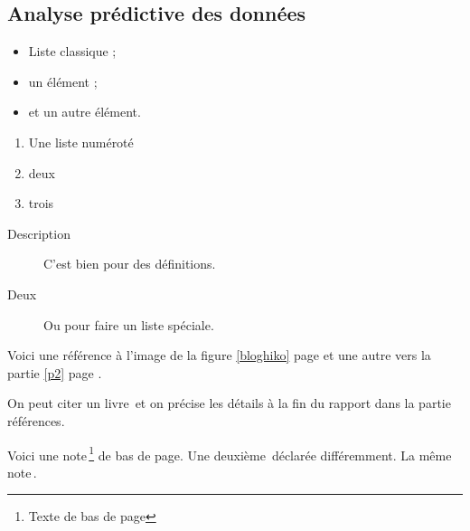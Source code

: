 \subsection{Analyse prédictive des données}

\begin{itemize}
\item Liste classique ;
\item un élément ;
\item et un autre élément.
\end{itemize}
\vspace{\parskip} %

\begin{enumerate}
\item Une liste numéroté
\item deux
\item trois
\end{enumerate}
\vspace{\parskip}

\begin{description}
\item[Description] C'est bien pour des définitions.
\item[Deux] Ou pour faire un liste spéciale.
\end{description}
\vspace{\parskip}



Voici une référence à l'image de la figure \ref{bloghiko} page \pageref{bloghiko} et une autre vers la partie \ref{p2} page \pageref{p2}.

On peut citer un livre\, et on précise les détails à la fin du rapport dans la partie références.



Voici une note\,\footnote{Texte de bas de page} de bas de page.
Une deuxième\,\footnotemark{} déclarée différemment.
La même note\,\footnotemark[\value{footnote}].




